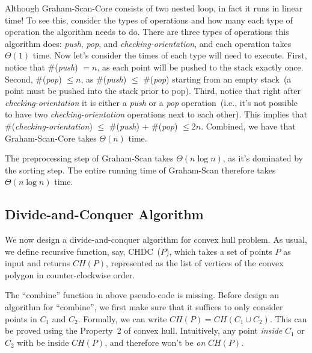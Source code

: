 Although Graham-Scan-Core consists of two nested loop, in fact it runs in linear time!
To see this, consider the types of operations and how many each type of operation
the algorithm needs to do.  There are three types of operations this algorithm does: \emph{push}, \emph{pop}, and \emph{checking-orientation},
and each operation takes $\Theta(1)$ time. Now let's consider the times of each type will need to execute.
First, notice that \#(\emph{push}) $= n$, as each point will be pushed to the stack exactly once.
Second, \#(\emph{pop}) $\le n$, as \#(\emph{push}) $\le$ \#(\emph{pop}) starting from an empty stack~(a point must be pushed into the stack prior to pop).
Third, notice that right after \emph{checking-orientation} it is either a \emph{push} or a \emph{pop} operation~(i.e.,
it's not possible to have two \emph{checking-orientation} operations next to each other).
This implies that \#(\emph{checking-orientation}) $\le$ \#(\emph{push}) + \#(\emph{pop}) $\le 2n$.
Combined, we have that Graham-Scan-Core takes $\Theta(n)$ time.

The preprocessing step of Graham-Scan takes $\Theta(n \log n)$, as it's dominated by the sorting step.
The entire running time of Graham-Scan therefore takes $\Theta(n \log n)$ time.

\subsection*{Divide-and-Conquer Algorithm}

We now design a divide-and-conquer algorithm for convex hull problem.
As usual, we define recursive function, say, CHDC~($P$), which takes
a set of points $P$ as input and returns $CH(P)$, represented
as the list of vertices of the convex polygon in counter-clockwise order.

\begin{algorithmblock}[0.8\textwidth]
	\xxx
	\xxx
	\xxx
	\xxx
	\xxx
\end{algorithmblock}

The ``combine'' function in above pseudo-code is missing.
Before design an algorithm for ``combine'', we first make sure that
it suffices to only consider points in $C_1$ and $C_2$. Formally,
we can write $CH(P) = CH(C_1\cup C_2)$. This can be proved using the
Property~2 of convex hull. Intuitively, any point \emph{inside} $C_1$ or $C_2$
with be inside $CH(P)$, and therefore won't be \emph{on} $CH(P)$.

